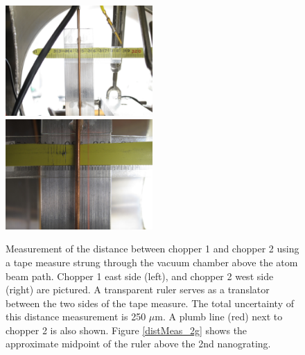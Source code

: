 \begin{figure}
\includegraphics[width=0.5\textwidth]{Figures/distMeas_c1e.jpg}
\includegraphics[width=0.5\textwidth]{Figures/distMeas_c2w.jpg}
\caption[Photographs for the measurement of the distance between chopper 1 and chopper 2.]{\label{distMeas_c1e_c2w}Measurement of the distance between chopper 1 and chopper 2 using a tape measure strung through the vacuum chamber above the atom beam path. Chopper 1 east side (left), and chopper 2 west side (right) are pictured. A transparent ruler serves as a translator between the two sides of the tape measure. The total uncertainty of this distance measurement is 250 $\mu$m. A plumb line (red) next to chopper 2 is also shown. Figure \ref{distMeas_2g} shows the approximate midpoint of the ruler above the 2nd nanograting.}
\end{figure}


